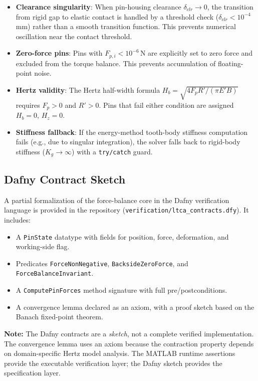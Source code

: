 \documentclass{article}
\begin{document}
\begin{itemize}[leftmargin=1.2em]
    \item \textbf{Clearance singularity}: When pin-housing clearance $\delta_{clr} \to 0$, the transition from rigid gap to elastic contact is handled by a threshold check ($\delta_{clr} < 10^{-4}$\,mm) rather than a smooth transition function. This prevents numerical oscillation near the contact threshold.
    \item \textbf{Zero-force pins}: Pins with $F_{p,i} < 10^{-6}$\,N are explicitly set to zero force and excluded from the torque balance. This prevents accumulation of floating-point noise.
    \item \textbf{Hertz validity}: The Hertz half-width formula $H_b = \sqrt{4 F_p R' / (\pi E' B)}$ requires $F_p > 0$ and $R' > 0$. Pins that fail either condition are assigned $H_b = 0$, $H_z = 0$.
    \item \textbf{Stiffness fallback}: If the energy-method tooth-body stiffness computation fails (e.g., due to singular integration), the solver falls back to rigid-body stiffness ($K_g \to \infty$) with a \texttt{try/catch} guard.
\end{itemize}

\subsection{Dafny Contract Sketch}

A partial formalization of the force-balance core in the Dafny verification language is provided in the repository (\texttt{verification/ltca\_contracts.dfy}). It includes:

\begin{itemize}[leftmargin=1.2em]
    \item A \texttt{PinState} datatype with fields for position, force, deformation, and working-side flag.
    \item Predicates \texttt{ForceNonNegative}, \texttt{BacksideZeroForce}, and \texttt{ForceBalanceInvariant}.
    \item A \texttt{ComputePinForces} method signature with full pre/postconditions.
    \item A convergence lemma declared as an axiom, with a proof sketch based on the Banach fixed-point theorem.
\end{itemize}

\noindent\textbf{Note:} The Dafny contracts are a \emph{sketch}, not a complete verified implementation. The convergence lemma uses an axiom because the contraction property depends on domain-specific Hertz model analysis. The MATLAB runtime assertions provide the executable verification layer; the Dafny sketch provides the specification layer.
\end{document}
